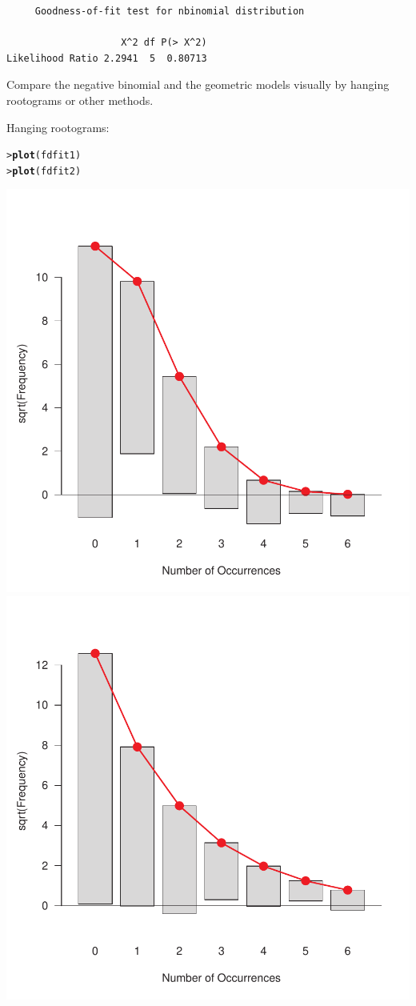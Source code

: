 \documentclass[10pt]{report}\usepackage[]{graphicx}\usepackage[]{color}
\makeatletter
\newcommand{\hlstd}[1]{\textcolor[rgb]{0.345,0.345,0.345}{#1}}%
\newcommand{\hlkwd}[1]{\textcolor[rgb]{0.737,0.353,0.396}{\textbf{#1}}}%
\newenvironment{kframe}{%
 \def\at@end@of@kframe{}%
 \ifinner\ifhmode%
  \def\at@end@of@kframe{\end{minipage}}%
  \begin{minipage}{\columnwidth}%
 \fi\fi%
 \def\FrameCommand##1{\hskip\@totalleftmargin \hskip-\fboxsep
 \colorbox{shadecolor}{##1}\hskip-\fboxsep
     \hskip-\linewidth \hskip-\@totalleftmargin \hskip\columnwidth}%
 \MakeFramed {\advance\hsize-\width
   \@totalleftmargin\z@ \linewidth\hsize
   \@setminipage}}%
 {\par\unskip\endMakeFramed%
 \at@end@of@kframe}
\newenvironment{knitrout}{}{} %
\renewenvironment{knitrout}{\small\renewcommand{\baselinestretch}{.85}}{} %
\makeatother
\begin{document}
\begin{Exercises}
\begin{enumerate*}
\begin{ans}
\begin{knitrout}
\begin{kframe}
\begin{verbatim}
	 Goodness-of-fit test for nbinomial distribution

                    X^2 df P(> X^2)
Likelihood Ratio 2.2941  5  0.80713
\end{verbatim}
\end{kframe}
\end{knitrout}
    \end{ans}
    
    \item Compare the negative binomial and the geometric models visually
    by hanging rootograms or other methods.
    \begin{ans}
    Hanging rootograms:
\begin{knitrout}\footnotesize
{}\color{fgcolor}\begin{kframe}
\begin{alltt}
\hlstd{> }\hlkwd{plot}\hlstd{(fdfit1)}
\hlstd{> }\hlkwd{plot}\hlstd{(fdfit2)}
\end{alltt}
\end{kframe}

\centerline{\includegraphics[width=.49\textwidth]{soln/fig/ex3_5c1-1} 
\includegraphics[width=.49\textwidth]{soln/fig/ex3_5c1-2} }




\end{knitrout}
\end{ans}
\end{enumerate*}
\end{Exercises}
\end{document}
